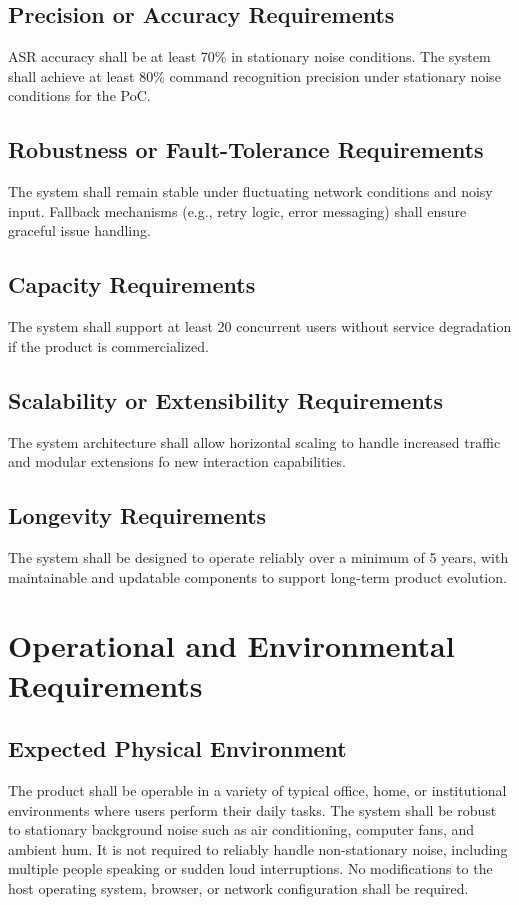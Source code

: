 \documentclass[11pt]{article}
\begin{document}
\subsection{Precision or Accuracy Requirements}
ASR accuracy shall be at least 70\% in stationary noise conditions. The system shall achieve at least 80\% command recognition precision under stationary noise conditions for the PoC.
\subsection{Robustness or Fault-Tolerance Requirements}
The system shall remain stable under fluctuating network conditions and noisy input. Fallback mechanisms (e.g., retry logic, error messaging) shall ensure graceful issue handling.
\subsection{Capacity Requirements}
The system shall support at least 20 concurrent users without service degradation if the product is commercialized.
\subsection{Scalability or Extensibility Requirements}
The system architecture shall allow horizontal scaling to handle increased traffic and modular extensions fo new interaction capabilities. 
\subsection{Longevity Requirements}
The system shall be designed to operate reliably over a minimum of 5 years, with maintainable and updatable components to support long-term product evolution.

\section{Operational and Environmental Requirements}
\subsection{Expected Physical Environment}
The product shall be operable in a variety of typical office, home, or institutional environments where users perform their daily tasks. The system shall be robust to stationary background noise such as air conditioning, computer fans, and ambient hum. It is not required to reliably handle non-stationary noise, including multiple people speaking or sudden loud interruptions. No modifications to the host operating system, browser, or network configuration shall be required.
\end{document}
